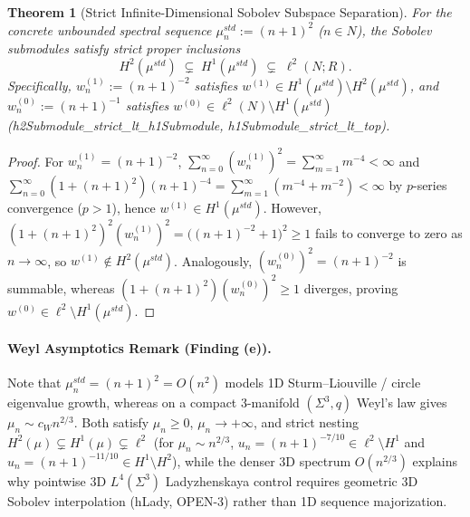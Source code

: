 \documentclass[american,11pt,letterpaper]{article}
\newtheorem{theorem}{Theorem}[section]
\def\mathbb#1{#1}%
\def\mathrm#1{#1}%
\def\texttt#1{#1}%
\begin{document}
\begin{theorem}[Strict Infinite-Dimensional Sobolev Subspace Separation]
\label{thm:sobolev_strict_nesting}
For the concrete unbounded spectral sequence $\mu_n^{\mathrm{std}} := (n + 1)^2$ ($n \in \mathbb{N}$), the Sobolev submodules satisfy strict proper inclusions
\begin{equation}
H^2(\mu^{\mathrm{std}}) \;\subsetneq\; H^1(\mu^{\mathrm{std}}) \;\subsetneq\; \ell^2(\mathbb{N}; \mathbb{R}).
\label{eq:strict_sobolev_chain}
\end{equation}
Specifically, $w^{(1)}_n := (n + 1)^{-2}$ satisfies $w^{(1)} \in H^1(\mu^{\mathrm{std}}) \setminus H^2(\mu^{\mathrm{std}})$, and $w^{(0)}_n := (n + 1)^{-1}$ satisfies $w^{(0)} \in \ell^2(\mathbb{N}) \setminus H^1(\mu^{\mathrm{std}})$ (\texttt{h2\allowbreak{}Submodule\_\allowbreak{}strict\_\allowbreak{}lt\_\allowbreak{}h1\allowbreak{}Submodule}, \texttt{h1\allowbreak{}Submodule\_\allowbreak{}strict\_\allowbreak{}lt\_\allowbreak{}top}).
\end{theorem}

\begin{proof}
For $w^{(1)}_n = (n+1)^{-2}$, $\sum_{n=0}^\infty (w^{(1)}_n)^2 = \sum_{m=1}^\infty m^{-4} < \infty$ and $\sum_{n=0}^\infty (1 + (n+1)^2)(n+1)^{-4} = \sum_{m=1}^\infty (m^{-4} + m^{-2}) < \infty$ by $p$-series convergence ($p > 1$), hence $w^{(1)} \in H^1(\mu^{\mathrm{std}})$. However, $(1 + (n+1)^2)^2 (w^{(1)}_n)^2 = \bigl((n+1)^{-2} + 1\bigr)^2 \ge 1$ fails to converge to zero as $n \to \infty$, so $w^{(1)} \notin H^2(\mu^{\mathrm{std}})$. Analogously, $(w^{(0)}_n)^2 = (n+1)^{-2}$ is summable, whereas $(1 + (n+1)^2)(w^{(0)}_n)^2 \ge 1$ diverges, proving $w^{(0)} \in \ell^2 \setminus H^1(\mu^{\mathrm{std}})$.
\end{proof}

\paragraph{Weyl Asymptotics Remark (\texttt{Finding (e)}).}
Note that $\mu_n^{\mathrm{std}} = (n+1)^2 = O(n^2)$ models 1D Sturm--Liouville / circle eigenvalue growth, whereas on a compact 3-manifold $(\Sigma^3, q)$ Weyl's law gives $\mu_n \sim c_W n^{2/3}$. Both satisfy $\mu_n \ge 0$, $\mu_n \to +\infty$, and strict nesting $H^2(\mu) \subsetneq H^1(\mu) \subsetneq \ell^2$ (for $\mu_n \sim n^{2/3}$, $u_n = (n+1)^{-7/10} \in \ell^2 \setminus H^1$ and $u_n = (n+1)^{-11/10} \in H^1 \setminus H^2$), while the denser 3D spectrum $O(n^{2/3})$ explains why pointwise 3D $L^4(\Sigma^3)$ Ladyzhenskaya control requires geometric 3D Sobolev interpolation (\texttt{hLady}, \texttt{OPEN-3}) rather than 1D sequence majorization.
\end{document}
